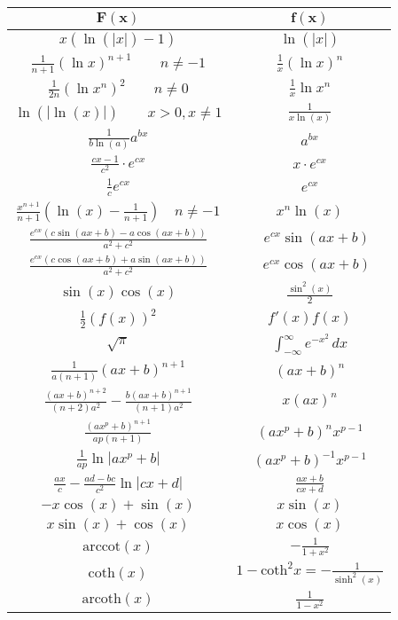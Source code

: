 \documentclass[a4paper, 10pt]{article}
\theoremstyle{definition}
\begin{document}
\begin{center}
\begin{tabular}{c|c}
    $\mathbf{F(x)}$ & $\mathbf{f(x)}$ \\
    \midrule
    $x  (\ln(|x|) - 1)$ & $\ln(|x|)$ \\
    $\frac{1}{n+1} (\ln x)^{n+1} \quad \quad n \neq -1 $ & $ \frac{1}{x}(\ln x)^n$ \\
    $\frac{1}{2n} (\ln x^n)^{2} \quad \quad n \neq 0 $ & $ \frac{1}{x}\ln x^n$ \\
    $\ln(|\ln(x)|) \quad \quad x > 0, x \neq 1$ & $\frac{1}{x \ln(x)}$ \\
    $\frac{1}{b \ln(a)} a^{bx}$ & $a^{bx}$ \\
    $\frac{cx - 1}{c^2} \cdot e^{cx}$ & $x \cdot e^{cx}$ \\
    $\frac{1}{c}e^{cx}$ & $e^{cx}$ \\
    $\frac{x^{n + 1}}{n + 1} \left(\ln(x) - \frac{1}{n + 1}\right) \quad n \neq -1 $ & $x^n \ln(x)$ \\
    $\frac{e^{cx} \left(c \sin(ax + b) - a \cos(ax + b) \right)}{a^2 + c^2}$ & $\quad e^{cx} \sin (ax + b) $ \\
    $\frac{e^{cx} \left(c \cos (ax + b) + a \sin(ax + b) \right)}{a^2 + c^2}$ & $\quad e^{cx} \cos (ax+b)$ \\
    $\sin(x)\cos(x)$ & $\frac{\sin^2(x)}{2}$ \\
    $\frac{1}{2}(f(x))^2$ & $f'(x) f(x)$ \\
    $\sqrt{\pi}$ & $\int_{-\infty}^\infty e^{-x^2} \,dx$ \\
    $\frac{1}{a(n+1)}(ax+b)^{n+1}$ & $(ax+b)^n$ \\
    $\frac{(ax+b)^{n+2}}{(n+2)a^2} - \frac{b(ax+b)^{n+1}}{(n+1)a^2}$ & $x(ax)^n$ \\
    $\frac{(ax^p+b)^{n+1}}{ap(n+1)}$ & $(ax^p+b)^n x^{p-1}$ \\
    $\frac{1}{ap} \ln |ax^p + b|$ & $(ax^p + b)^{-1} x^{p-1}$ \\
    $\frac{ax}{c} - \frac{ad-bc}{c^2} \ln |cx +d|$ & $\frac{ax+b}{cx+d}$ \\
    $- x \cos (x) + \sin(x)$ & $x \sin (x)$ \\
    $x \sin(x) + \cos (x)$ & $x \cos (x)$ \\
    $\text{arccot}(x)$ & $- \frac{1}{1 + x^2}$ \\
    $\text{coth}(x)$ & $1 - \text{coth}^2 x = - \frac{1}{\sinh^2(x)}$ \\
    $\text{arcoth}(x)$ & $\frac{1}{1 - x^2}$ \\
\end{tabular}
\end{center}
\end{document}
